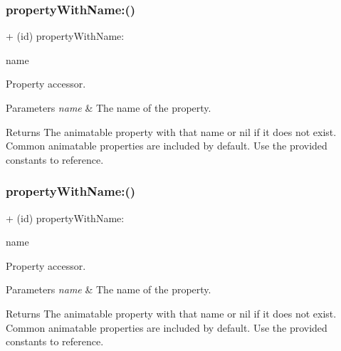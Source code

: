 \subsubsection{\texorpdfstring{property\+With\+Name\+:()}{propertyWithName:()}\hspace{0.1cm}{\footnotesize\ttfamily [2/3]}}
{\footnotesize\ttfamily + (id) property\+With\+Name\+: \begin{DoxyParamCaption}\item[{(N\+S\+String $\ast$)}]{name }\end{DoxyParamCaption}}

Property accessor. 
\begin{DoxyParams}{Parameters}
{\em name} & The name of the property. \\
\hline
\end{DoxyParams}
\begin{DoxyReturn}{Returns}
The animatable property with that name or nil if it does not exist.  Common animatable properties are included by default. Use the provided constants to reference. 
\end{DoxyReturn}
\mbox{\label{interface_p_o_p_animatable_property_ad11b0dd7ba703f4ba087052ce57c12b4}} 
\subsubsection{\texorpdfstring{property\+With\+Name\+:()}{propertyWithName:()}\hspace{0.1cm}{\footnotesize\ttfamily [3/3]}}
{\footnotesize\ttfamily + (id) property\+With\+Name\+: \begin{DoxyParamCaption}\item[{(N\+S\+String $\ast$)}]{name }\end{DoxyParamCaption}}

Property accessor. 
\begin{DoxyParams}{Parameters}
{\em name} & The name of the property. \\
\hline
\end{DoxyParams}
\begin{DoxyReturn}{Returns}
The animatable property with that name or nil if it does not exist.  Common animatable properties are included by default. Use the provided constants to reference. 
\end{DoxyReturn}
\mbox{\label{interface_p_o_p_animatable_property_aad3690254419e0353ebfa982a22d8c6e}} 
